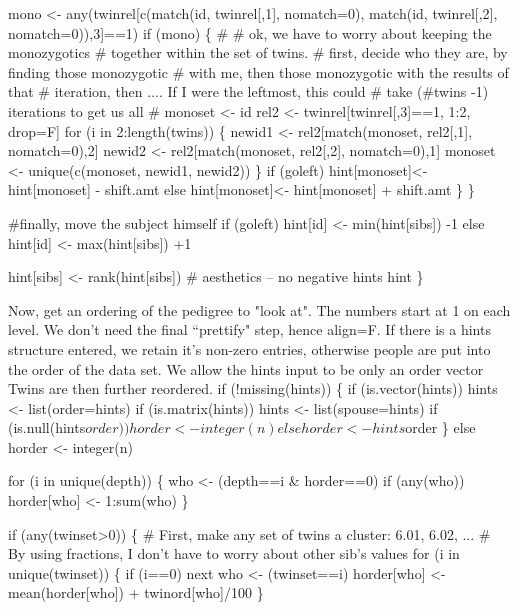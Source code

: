 \documentclass{article}
\begin{document}
        mono  <- any(twinrel[c(match(id, twinrel[,1], nomatch=0),
                           match(id, twinrel[,2], nomatch=0)),3]==1)
        if (mono) \{
        #
        # ok, we have to worry about keeping the monozygotics
        #  together within the set of twins.
        # first, decide who they are, by finding those monozygotic
            #  with me, then those monozygotic with the results of that
            #  iteration, then ....  If I were the leftmost, this could
            #  take (#twins -1) iterations to get us all
            #
        monoset <- id
        rel2 <- twinrel[twinrel[,3]==1, 1:2, drop=F]
        for (i in 2:length(twins)) \{
            newid1 <- rel2[match(monoset, rel2[,1], nomatch=0),2]
            newid2 <- rel2[match(monoset, rel2[,2], nomatch=0),1]
            monoset <- unique(c(monoset, newid1, newid2))
            \}
        if (goleft) 
               hint[monoset]<- hint[monoset] - shift.amt
        else   hint[monoset]<- hint[monoset] + shift.amt
        \}
        \}

    #finally, move the subject himself
    if (goleft) hint[id] <- min(hint[sibs]) -1   
    else        hint[id] <- max(hint[sibs]) +1

    hint[sibs] <- rank(hint[sibs])  # aesthetics -- no negative hints
    hint
    \}
\nwendcode{}\nwdocspar

Now, get an ordering of the pedigree to "look at".  
The numbers start at 1 on each level.
We don't need the final ``prettify" step, hence align=F.
If there is a hints structure entered, we retain it's non-zero entries,
otherwise people are put into the order of the data set. 
We allow the hints input to be only an order vector
Twins are
then further reordered.
\nwenddocs{}\endmoddef
if (!missing(hints)) \{
    if (is.vector(hints)) hints <- list(order=hints)
    if (is.matrix(hints)) hints <- list(spouse=hints)
    if (is.null(hints$order)) horder <- integer(n)
    else horder <- hints$order
    \}
else horder <- integer(n)

for (i in unique(depth)) \{
    who <- (depth==i & horder==0)
    if (any(who)) horder[who] <- 1:sum(who)
    \}

if (any(twinset>0)) \{
    # First, make any set of twins a cluster: 6.01, 6.02, ...
    #  By using fractions, I don't have to worry about other sib's values
    for (i in unique(twinset)) \{
        if (i==0) next
        who <- (twinset==i)
        horder[who] <- mean(horder[who]) + twinord[who]/100
        \}
\end{document}
